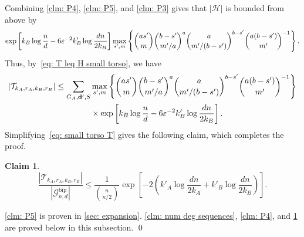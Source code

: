 \documentclass[11pt]{article}
\newcommand{\eps}{\varepsilon}
\theoremstyle{plain}
\newtheorem{claim}{Claim}[thm]
\begin{document}
 Combining \cref{clm: P4}, \cref{clm: P5}, and \cref{clm: P3} gives that $|\mathcal H|$ is bounded from above by 
\begin{equation}
     \exp\left[k_B\log\frac{n}{d}-6\eps^{-2}k_B'\log\frac{dn}{2k_B}\right]\max_{s', m}\left\{\binom{as'}{m}\binom{b - s'}{m'/a}^a\binom{a}{m'/(b - s')}^{b - s'}\binom{a(b - s')}{m'}^{-1} \right\}.\notag
\end{equation}
Thus, by~\eqref{eq: T leq H small torso}, we have 
\begin{align}
    |\mathcal T_{k_A, r_A, k_B, r_B}| \leq \sum_{G_A,\mathbf d', S} &\max_{s', m}\left\{\binom{as'}{m}\binom{b - s'}{m'/a}^a\binom{a}{m'/(b - s')}^{b - s'}\binom{a(b - s')}{m'}^{-1} \right\}\notag \\
    &\times \exp\left[k_B\log\frac{n}{d}-6\eps^{-2}k_B'\log\frac{dn}{2k_B}\right].\label{eq: small torso T}
\end{align}
Simplifying~\eqref{eq: small torso T} gives the following claim, which completes the proof.
\begin{claim}\label{clm: small torso simplification}
    \[
    \frac{|\mathcal T_{k_A, r_A, k_B, r_B}|}{|\mathcal G^{\text{bip}}_{n,d}|} \leq \frac{1}{\binom{n}{n/2}} \exp\left[ -2\left( k'_A\log\frac{dn}{2k_A} + k'_B\log\frac{dn}{2k_B}\right) \right].
    \]
\end{claim}
\cref{clm: P5} is proven in \cref{sec: expansion}. \cref{clm: num deg sequences}, \cref{clm: P4}, and \cref{clm: small torso simplification} are proved below in this subsection. 
\qed 



\medskip 
\end{document}
